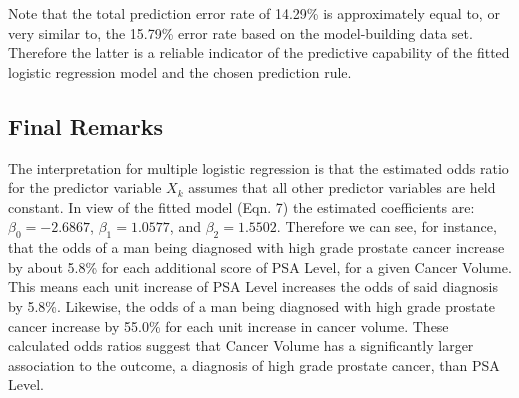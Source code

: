 Note that the total prediction error rate of 14.29\% is approximately equal to, or very similar to, the 15.79\% error rate based on the model-building data set. Therefore the latter is a reliable indicator of the predictive capability of the fitted logistic regression model and the chosen prediction rule.

\subsection{Final Remarks}
The interpretation for multiple logistic regression is that the estimated odds ratio for the predictor variable \(X_k\) assumes that all other predictor variables are held constant. In view of the fitted model (Eqn. 7) the estimated coefficients are: \(\beta_0 = -2.6867\), \(\beta_1 = 1.0577\), and \(\beta_2 = 1.5502\).
Therefore we can see, for instance, that the odds of a man being diagnosed with high grade prostate cancer increase by about 5.8\% for each additional score of PSA Level, for a given Cancer Volume. This means each unit increase of PSA Level increases the odds of said diagnosis by 5.8\%. Likewise, the odds of a man being diagnosed with high grade prostate cancer increase by  55.0\% for each unit increase in cancer volume. These calculated odds ratios suggest that Cancer Volume has a significantly larger association to the outcome, a diagnosis of high grade prostate cancer, than PSA Level. \par 



